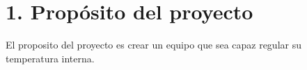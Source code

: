 \section{1. Propósito del proyecto}
\label{sec:proposito}

\quad El proposito del proyecto es crear un equipo que sea capaz regular su temperatura interna.